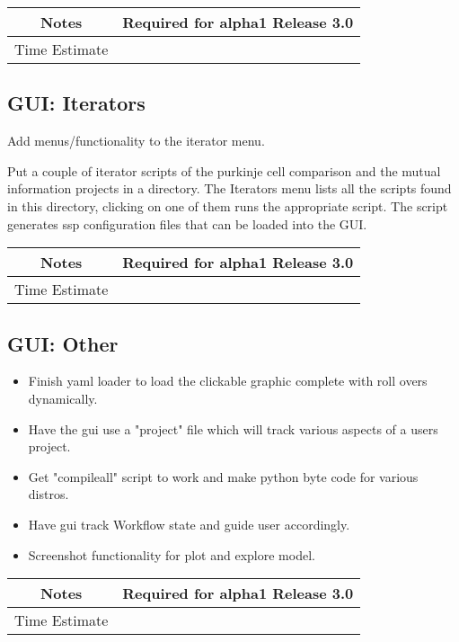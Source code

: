 \documentclass[12pt]{article}
\begin{document}
{
  \vspace{5mm}
  \centering
  \begin{tabular}{|c|c|}
    \hline
    Notes
    & Required for alpha1 Release 3.0 \\
    \hline
    Time Estimate
    & \\
    \hline
  \end{tabular}
}


\subsection{GUI: Iterators}
Add menus/functionality to the iterator menu.

Put a couple of iterator scripts of the purkinje cell comparison and
the mutual information projects in a directory.  The Iterators menu
lists all the scripts found in this directory, clicking on one of them
runs the appropriate script.  The script generates ssp configuration
files that can be loaded into the GUI.

{
  \vspace{5mm}
  \centering
  \begin{tabular}{|c|c|}
    \hline
    Notes
    & Required for alpha1 Release 3.0 \\
    \hline
    Time Estimate
    & \\
    \hline
  \end{tabular}
}


\subsection{GUI: Other}
\begin{itemize}
\item Finish yaml loader to load the clickable graphic complete with
  roll overs dynamically.
\item Have the gui use a "project" file which will track various
  aspects of a users project.
\item Get "compileall" script to work and make python byte code for
  various distros.
\item Have gui track Workflow state and guide user accordingly.
\item Screenshot functionality for plot and explore model.
\end{itemize}

{
  \vspace{5mm}
  \centering
  \begin{tabular}{|c|c|}
    \hline
    Notes
    & Required for alpha1 Release 3.0 \\
    \hline
    Time Estimate
    & \\
    \hline
  \end{tabular}
}
\end{document}
